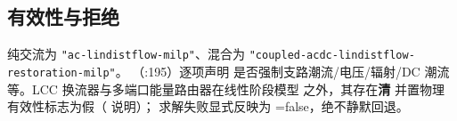 \subsection{有效性与拒绝}
 纯交流为 \texttt{"ac-lindistflow-milp"}、混合为
\texttt{"coupled-acdc-\allowbreak lindistflow-\allowbreak restoration-milp"}。
（:195）逐项声明
是否强制支路潮流/电压/辐射/DC 潮流等。LCC 换流器与多端口能量路由器在线性阶段模型
之外，其存在\textbf{清}  并置物理有效性标志为假（ 说明）；
求解失败显式反映为 =false，绝不静默回退。
